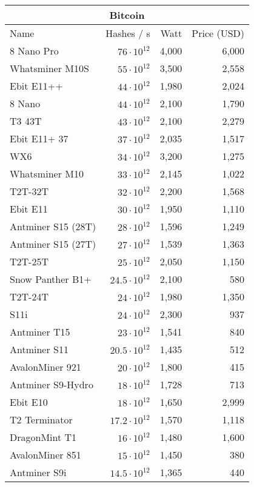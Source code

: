 \begin{longtable}{|p{}|r|r|r|}
  \hline
  \multicolumn{4}{|c|}{\textbf{Bitcoin}} \\
  \hline
  Name & Hashes / s & Watt & Price (USD) \\
  \hhline{|=|=|=|=|}
  8 Nano Pro & $76 \cdot 10^{12}$ & 4,000 & 6,000 \\
  Whatsminer M10S & $55 \cdot 10^{12}$ & 3,500 & 2,558 \\
  Ebit E11++ & $44 \cdot 10^{12}$ & 1,980 & 2,024 \\
  8 Nano & $44 \cdot 10^{12}$ & 2,100 & 1,790 \\
  T3 43T & $43 \cdot 10^{12}$ & 2,100 & 2,279 \\
  Ebit E11+ 37 & $37 \cdot 10^{12}$ & 2,035 & 1,517 \\
  WX6 & $34 \cdot 10^{12}$ & 3,200 & 1,275 \\
  Whatsminer M10 & $33 \cdot 10^{12}$ & 2,145 & 1,022 \\
  T2T-32T & $32 \cdot 10^{12}$ & 2,200 & 1,568 \\
  Ebit E11 & $30 \cdot 10^{12}$ & 1,950 & 1,110 \\
  Antminer S15 (28T) & $28 \cdot 10^{12}$ & 1,596 & 1,249 \\
  Antminer S15 (27T) & $27 \cdot 10^{12}$ & 1,539 & 1,363 \\
  T2T-25T & $25 \cdot 10^{12}$ & 2,050 & 1,150 \\
  Snow Panther B1+ & $24.5 \cdot 10^{12}$ & 2,100 & 580 \\
  T2T-24T & $24 \cdot 10^{12}$ & 1,980 & 1,350 \\
  S11i & $24 \cdot 10^{12}$ & 2,300 & 937 \\
  Antminer T15 & $23 \cdot 10^{12}$ & 1,541 & 840 \\
  Antminer S11 & $20.5 \cdot 10^{12}$ & 1,435 & 512 \\
  AvalonMiner 921 & $20 \cdot 10^{12}$ & 1,800 & 415 \\
  Antminer S9-Hydro & $18 \cdot 10^{12}$ & 1,728 & 713 \\
  Ebit E10 & $18 \cdot 10^{12}$ & 1,650 & 2,999 \\
  T2 Terminator & $17.2 \cdot 10^{12}$ & 1,570 & 1,118 \\
  DragonMint T1 & $16 \cdot 10^{12}$ & 1,480 & 1,600 \\
  AvalonMiner 851 & $15 \cdot 10^{12}$ & 1,450 & 380 \\
  Antminer S9i & $14.5 \cdot 10^{12}$ & 1,365 & 440 \\

\end{longtable}
